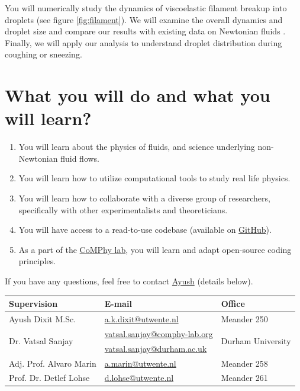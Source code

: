 \documentclass[a4paper,10pt]{article}
\begin{document}
You will numerically study the dynamics of viscoelastic filament breakup into droplets (see figure \ref{fig:filament}). We will examine the overall dynamics and droplet size and compare our results with existing data on Newtonian fluids \citep{anthony2019dynamics}. Finally, we will apply our analysis to understand droplet distribution during coughing or sneezing. 

\section*{What you will do and what you will learn?}
\begin{enumerate}
\item You will learn about the physics of fluids, and science underlying non-Newtonian fluid flows. 
\item You will learn how to utilize computational tools to study real life physics. 
\item You will learn how to collaborate with a diverse group of researchers, specifically with other experimentalists and theoreticians.
\item You will have access to a read-to-use codebase (available on \href{https://github.com/comphy-lab/multirheoflow}{GitHub}).
\item As a part of the \href{https://comphy-lab.org}{CoMPhy lab}, you will learn and adapt open-source coding principles. 

\end{enumerate}

If you have any questions, feel free to contact \href{mailto:a.k.dixit@utwente.nl}{Ayush} (details below).
\begin{center}
\begin{tabular}{|l|l|l|}
\hline \textbf{Supervision} & \textbf{E-mail} & \textbf{Office} \\
\hline Ayush Dixit M.Sc. & \href{mailto:a.k.dixit@utwente.nl}{a.k.dixit@utwente.nl} & Meander 250 \\
\hline \multirow{2}{*}{Dr. Vatsal Sanjay} & \href{mailto:vatsal.sanjay@comphy-lab.org}{vatsal.sanjay@comphy-lab.org} & \multirow{2}{*}{Durham University} \\
& \href{mailto:vatsal.sanjay@durham.ac.uk}{vatsal.sanjay@durham.ac.uk} & \\
\hline Adj. Prof. Alvaro Marin & \href{mailto:a.marin@utwente.nl}{a.marin@utwente.nl} & Meander 258 \\
\hline Prof. Dr. Detlef Lohse & \href{mailto:d.lohse@utwente.nl}{d.lohse@utwente.nl} & Meander 261  \\
\hline
\end{tabular}
\end{center}
\printbibliography
\end{document}
